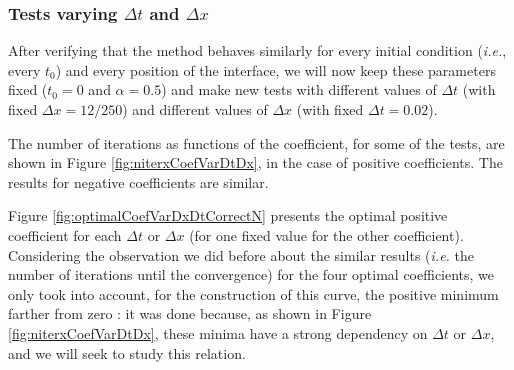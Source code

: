 \subsubsection{Tests varying $\Delta t$ and $\Delta x$}

\indent After verifying that the method behaves similarly for every initial condition (\emph{i.e.}, every $t_0$) and every position of the interface, we will now keep these parameters fixed ($t_0 = 0$ and $\alpha = 0.5$) and make new tests with different values of $\Delta t$ (with fixed $\Delta x = 12/250$) and different values of $\Delta x$ (with fixed $\Delta t = 0.02$).

\indent The number of iterations as functions of the coefficient, for some of the tests, are shown in Figure \ref{fig:niterxCoefVarDtDx}, in the case of positive coefficients. The results for negative coefficients are similar.

\indent Figure \ref{fig:optimalCoefVarDxDtCorrectN} presents the optimal positive coefficient for each $\Delta t$ or $\Delta x$ (for one fixed value for the other coefficient). Considering the observation we did before about the similar results (\emph{i.e.} the number of iterations until the convergence) for the four optimal coefficients, we only took into account, for the construction of this curve, the positive minimum farther from zero : it was done because, as shown in Figure \ref{fig:niterxCoefVarDtDx}, these minima have a strong dependency on $\Delta t$ or $\Delta x$, and we will seek to study this relation.

